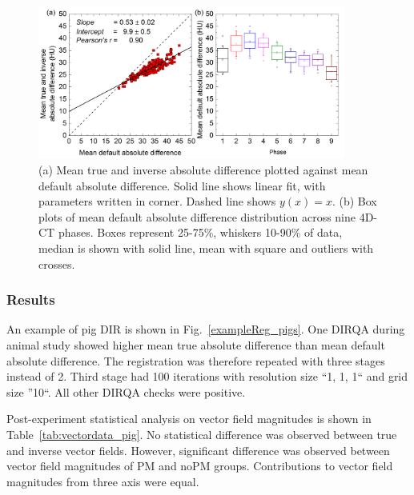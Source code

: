 \documentclass[type=dr, dr=rernat, accentcolor=tud7b,colorbacktitle, bigchapter, openright, twoside, 12pt ]{tudthesis}
\begin{document}
\begin{figure}[H]
	\begin{center}		
		\includegraphics[width=0.9\textwidth]{./Images/AbsDiff_pigs.png}
		\caption{(a) Mean true and inverse absolute difference plotted against mean default absolute difference. Solid line shows linear fit, with parameters
		written in corner. Dashed line shows $y(x)=x$. (b) Box plots of mean default absolute difference distribution across nine 4D-CT phases. Boxes represent 25-75\%, whiskers 10-90\%
		of data, median is shown with solid line, mean with square and outliers with crosses.}
		\label{absDiff_pigs}
	\end{center}
\end{figure}

\subsubsection{Results}

An example of pig DIR is shown in Fig.~\ref{exampleReg_pigs}. One DIRQA during animal study showed higher mean true absolute difference than mean default absolute difference. The registration
was therefore repeated with three stages instead of 2. Third stage had 100 iterations with resolution size ``1, 1, 1`` and grid size ''10``. All other DIRQA checks were positive.

Post-experiment statistical analysis on vector field magnitudes is shown in Table~\ref{tab:vectordata_pig}. No statistical difference was
observed between true and inverse vector fields. However, significant difference was observed between vector field magnitudes of PM and noPM groups. Contributions to vector field magnitudes from three axis were equal. 
\end{document}
